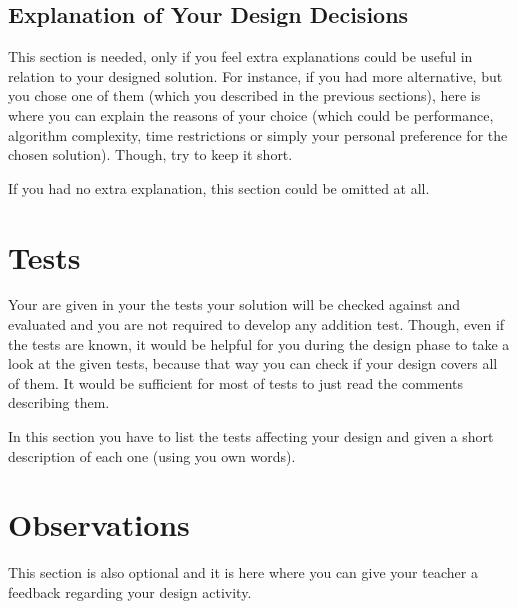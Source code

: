 \subsection{Explanation of Your Design Decisions}

This section is needed, only if you feel extra explanations could be useful in relation to your designed solution. For instance, if you had more alternative, but you chose one of them (which you described in the previous sections), here is where you can explain the reasons of your choice (which could be performance, algorithm complexity, time restrictions or simply your personal preference for the chosen solution). Though, try to keep it short. 

If you had no extra explanation, this section could be omitted at all. 

\section{Tests}

Your are given in your \OSName{} the tests your solution will be checked against and evaluated and you are not required to develop any addition test. Though, even if the tests are known, it would be helpful for you during the design phase to take a look at the given tests, because that way you can check if your design covers all of them. It would be sufficient for most of tests to just read the comments describing them.

In this section you have to list the tests affecting your design and given a short description of each one (using you own words).


\section{Observations}

This section is also optional and it is here where you can give your teacher a feedback regarding your design activity.

